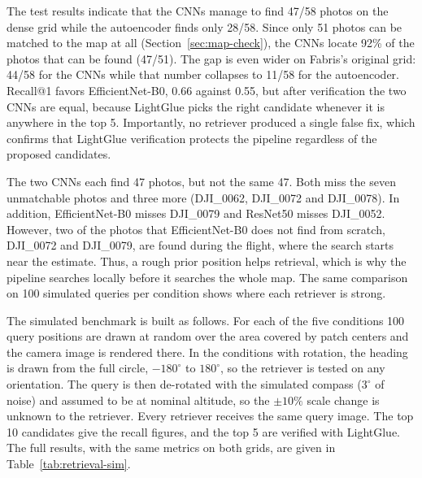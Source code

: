 \documentclass[english, Lau, oneside]{sapthesis}%
\begin{document}
The test results indicate that the CNNs manage to find 47/58 photos on the dense grid while the autoencoder finds only 28/58. Since only 51 photos can be matched to the map at all (Section~\ref{sec:map-check}), the CNNs locate 92\% of the photos that can be found (47/51). The gap is even wider on Fabris's original grid: 44/58 for the CNNs while that number collapses to 11/58 for the autoencoder. Recall@1 favors EfficientNet-B0, 0.66 against 0.55, but after verification the two CNNs are equal, because LightGlue picks the right candidate whenever it is anywhere in the top 5. Importantly, no retriever produced a single false fix, which confirms that LightGlue verification protects the pipeline regardless of the proposed candidates.

The two CNNs each find 47 photos, but not the same 47. Both miss the seven unmatchable photos and three more (DJI\_0062, DJI\_0072 and DJI\_0078). In addition, EfficientNet-B0 misses DJI\_0079 and ResNet50 misses DJI\_0052. However, two of the photos that EfficientNet-B0 does not find from scratch, DJI\_0072 and DJI\_0079, are found during the flight, where the search starts near the estimate. Thus, a rough prior position helps retrieval, which is why the pipeline searches locally before it searches the whole map. The same comparison on 100 simulated queries per condition shows where each retriever is strong.

The simulated benchmark is built as follows. For each of the five conditions 100 query positions are drawn at random over the area covered by patch centers and the camera image is rendered there. In the conditions with rotation, the heading is drawn from the full circle, $-180^\circ$ to $180^\circ$, so the retriever is tested on any orientation. The query is then de-rotated with the simulated compass ($3^\circ$ of noise) and assumed to be at nominal altitude, so the $\pm 10\%$ scale change is unknown to the retriever. Every retriever receives the same query image. The top 10 candidates give the recall figures, and the top 5 are verified with LightGlue. The full results, with the same metrics on both grids, are given in Table~\ref{tab:retrieval-sim}.
\end{document}
